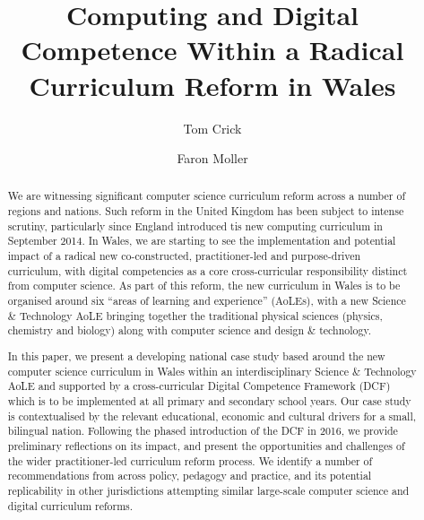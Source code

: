 \documentclass[sigconf]{acmart}
\begin{document}
\title{Computing and Digital Competence Within a Radical Curriculum Reform in Wales}

\author{Tom Crick}

\author{Faron Moller}
 


\begin{abstract}
We are witnessing significant computer science curriculum reform
across a number of regions and nations. Such reform in the United
Kingdom has been subject to intense scrutiny, particularly since
England introduced tis new computing curriculum in September 2014. In
Wales, we are starting to see the implementation and potential impact
of a radical new co-constructed, practitioner-led and purpose-driven
curriculum, with digital competencies as a core cross-curricular
responsibility distinct from computer science. As part of this reform,
the new curriculum in Wales is to be organised around six ``areas of
learning and experience'' (AoLEs), with a new Science \& Technology
AoLE bringing together the traditional physical sciences (physics,
chemistry and biology) along with computer science and design \&
technology.

In this paper, we present a developing national case study based
around the new computer science curriculum in Wales within an
interdisciplinary Science \& Technology AoLE and supported by a
cross-curricular Digital Competence Framework (DCF) which is to be
implemented at all primary and secondary school years. Our case study
is contextualised by the relevant educational, economic and cultural
drivers for a small, bilingual nation. Following the phased
introduction of the DCF in 2016, we provide preliminary reflections on
its impact, and present the opportunities and challenges of the wider
practitioner-led curriculum reform process. We identify a number of
recommendations from across policy, pedagogy and practice, and its
potential replicability in other jurisdictions attempting similar
large-scale computer science and digital curriculum reforms.
\end{abstract}
\end{document}
